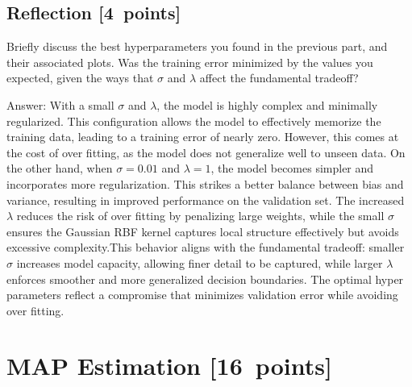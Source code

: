 \documentclass{article}
\newcommand{\blu}[1]{{\textcolor{blu}{#1}}}
\newcommand{\gre}[1]{\textcolor{gre}{#1}}
\newcommand\ans[1]{\par\gre{Answer: #1}}
\let\ask\blu
\newcommand\pts[1]{\textcolor{pointscolour}{[#1~points]}}
\begin{document}
\subsection{Reflection \pts{4}}
\ask{
Briefly discuss the best hyperparameters you found in the previous part, and their associated plots. Was the training error minimized by the values you expected, given the ways that $\sigma$ and $\lambda$ affect the fundamental tradeoff?
}
\ans{With a small $\sigma$ and $\lambda$, the model is highly complex and minimally regularized. This configuration allows the model to effectively memorize the training data, leading to a training error of nearly zero. However, this comes at the cost of over fitting, as the model does not generalize well to unseen data. \newline\newline On the other hand, when $\sigma = 0.01$ and $\lambda = 1$, the model becomes simpler and incorporates more regularization. This strikes a better balance between bias and variance, resulting in improved performance on the validation set. The increased $\lambda$ reduces the risk of over fitting by penalizing large weights, while the small $\sigma$ ensures the Gaussian RBF kernel captures local structure effectively but avoids excessive complexity.\newline\newline This behavior aligns with the fundamental tradeoff: smaller $\sigma$ increases model capacity, allowing finer detail to be captured, while larger $\lambda$ enforces smoother and more generalized decision boundaries. The optimal hyper parameters reflect a compromise that minimizes validation error while avoiding over fitting.}
\clearpage
\section{MAP Estimation \pts{16}}
\end{document}
